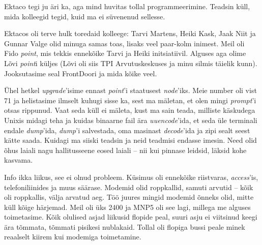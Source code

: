 
Ektaco tegi ju äri ka, aga mind huvitas tollal 
programmeerimine. Teadsin küll, mida kolleegid tegid, kuid ma 
ei süvenenud sellesse.


Ektacos oli terve hulk toredaid kolleege: 
Tarvi Martens, Heiki Kask, Jaak 
Niit ja Gunnar Valge olid 
minuga samas toas, lisaks veel paar-kolm inimest. Meil oli 
Fido \emph{point}, mis tekkis ennekõike Tarvi ja Heiki 
initsiatiivil. Alguses aga olime Lõvi \emph{point}i küljes 
(Lõvi oli siis TPI 
Arvutuskeskuses ja minu silmis täielik
kunn). Jooksutasime seal FrontDoori ja mida kõike veel. 

Ühel hetkel \emph{upgrade}'isime ennast \emph{point}'i staatusest 
\emph{node}'iks. Meie number oli vist 71 ja helistasime ilmselt
kuhugi sisse ka, sest ma mäletan, et olen mingi \emph{prompt}'i otsas 
rippunud. Vaat seda küll ei mäleta, kust ma sain teada, milliste käskudega 
Unixis midagi teha ja kuidas binaarne fail ära 
\emph{uuencode}'ida, et seda üle terminali endale 
\emph{dump}'ida, \emph{dump}'i salvestada, oma masinast \emph{decode}'ida ja 
zipi sealt seest kätte saada. Kuidagi ma siiski teadsin ja neid teadmisi endasse
imesin. Need olid 
õhus laiali nagu hallitusseene eosed laiali -- nii kui pinnase 
leidsid, läksid kohe kasvama. 


Info ikka liikus, see ei olnud probleem. Küsimus oli 
ennekõike riistvaras, \emph{access}'is, telefoniliinides ja muus säärase. Modemid olid roppkallid, samuti arvutid -- kõik oli roppkallis, 
välja arvatud aeg. Töö juures mingid modemid õnneks olid, mitte küll 
kõige härjemad. Meil oli üks 2400 ja MNP5 oli see lagi, millega me alguses toimetasime. 
Kõik olulised asjad liikusid flopide peal, suuri asju ei viitsinud keegi 
ära tõmmata, tõmmati pisikesi nublakaid. Tollal oli flopiga bussi peale 
minek reaalselt kiirem kui modemiga toimetamine.

